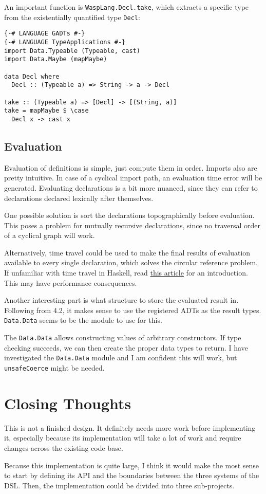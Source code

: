 An important function is \texttt{WaspLang.Decl.take}, which extracts a specific
type from the existentially quantified type \texttt{Decl}:

\begin{minipage}{\linewidth}
\begin{lstlisting}
{-# LANGUAGE GADTs #-}
{-# LANGUAGE TypeApplications #-}
import Data.Typeable (Typeable, cast)
import Data.Maybe (mapMaybe)

data Decl where
  Decl :: (Typeable a) => String -> a -> Decl

take :: (Typeable a) => [Decl] -> [(String, a)]
take = mapMaybe $ \case
  Decl x -> cast x
\end{lstlisting}
\end{minipage}

\subsection{Evaluation}

Evaluation of definitions is simple, just compute them in order. Imports also
are pretty intuitive. In case of a cyclical import path, an evaluation time
error will be generated. Evaluating declarations is a bit more nuanced,
since they can refer to declarations declared lexically after themselves.

One possible solution is sort the declarations topographically before
evaluation. This poses a problem for mutually recursive declarations, since
no traversal order of a cyclical graph will work.

Alternatively, time travel could be used to make the final results of
evaluation available to every single declaration, which solves
the circular reference problem. If unfamiliar with time travel in Haskell, read
\href{https://blog.csongor.co.uk/time-travel-in-haskell-for-dummies/}{this article}
for an introduction. This may have performance consequences.

Another interesting part is what structure to store the evaluated result in.
Following from 4.2, it makes sense to use the registered ADTs as the result
types. \texttt{Data.Data} seems to be the module to use for this.

The \texttt{Data.Data} allows constructing values of arbitrary constructors.
If type checking succeeds, we can then create the proper data types to return.
I have investigated the \texttt{Data.Data} module and I am confident this will
work, but \texttt{unsafeCoerce} might be needed.

\section{Closing Thoughts}

This is not a finished design. It definitely needs more work before
implementing it, especially because its implementation will take a lot of work
and require changes across the existing code base.

Because this implementation is quite large, I think it would make the most
sense to start by defining its API and the boundaries between the three systems
of the DSL. Then, the implementation could be divided into three
sub-projects.
